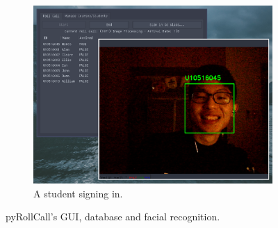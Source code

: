 \begin{figure}[b!]
\begin{subfigure}[b]{0.32\linewidth}
    \includegraphics[width=\linewidth]{figures/preview3.eps}
    \caption{A student signing in.}
  \end{subfigure}
  \caption{pyRollCall's GUI, database and facial recognition.}
  \label{fig:implementation}
\end{figure}
